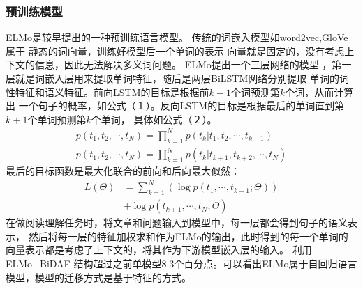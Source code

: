\subsubsection{预训练模型}
ELMo是较早提出的一种预训练语言模型。
传统的词嵌入模型如word2vec,GloVe属于
静态的词向量，训练好模型后一个单词的表示
向量就是固定的，没有考虑上下文的信息，因此无法解决多义词问题。
ELMo提出一个三层网络的模型
，第一层就是词嵌入层用来提取单词特征，随后是两层BiLSTM网络分别提取
单词的词性特征和语义特征。前向LSTM的目标是根据前$k-1$个词预测第$k$个词，从而计算出
一个句子的概率，如公式（１）。反向LSTM的目标是根据最后的单词直到第$k+1$个单词预测第$k$个单词，
具体如公式（２）。
\begin{gather}
    p(t_1,t_2,\cdots,t_N)=\prod_{k=1}^{N}p(t_k|t_1,t_2,\cdots,t_{k-1})\\
    p(t_1,t_2,\cdots,t_N)=\prod_{k=1}^{N}p(t_k|t_{k+1},t_{k+2},\cdots,t_{N})
\end{gather}
最后的目标函数是最大化联合的前向和后向最大似然：
\begin{equation}
    \begin{split}
    L(\Theta)&=\sum_{k=1}^{N}(\log p(t_1,\cdots,t_{k-1};\Theta)) \\
        &+\log p(t_{k+1},\cdots,t_N;\Theta)
    \end{split}
\end{equation}
在做阅读理解任务时，将文章和问题输入到模型中，每一层都会得到句子的语义表示，
然后将每一层的特征加权求和作为ELMo的输出，此时得到的每一个单词的
向量表示都是考虑了上下文的，将其作为下游模型嵌入层的输入。
利用ELMo+BiDAF
结构超过之前单模型8.3个百分点。可以看出ELMo属于自回归语言模型，模型的迁移方式是基于特征的方式。
\begin{table*}[!ht]
    \caption{预训练语言模型对比}
    \centering
    \vspace{10pt}
\end{table*}



